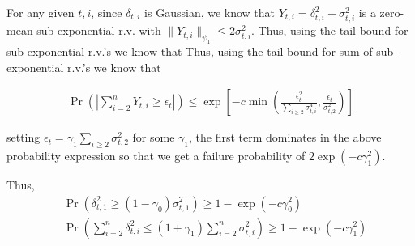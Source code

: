 \documentclass[10pt]{article}
\begin{document}

For any given $t,i$, since $\delta_{t,i}$ is Gaussian, we know that $Y_{t,i} = \delta_{t,i}^2 - \sigma_{t,i}^2$ is a zero-mean sub exponential r.v. with $\|Y_{t,i}\|_{\psi_1} \leq 2 \sigma_{t,i}^2$. Thus, using the tail bound for sub-exponential r.v.'s we know that
Thus, using the tail bound for sum of sub-exponential r.v.'s we know that

\begin{align}\label{eq:del_bnd}
\Pr\left( \left| \sum_{i=2}^n Y_{t,i} \geq \epsilon_{t} \right| \right) \leq \exp\left[-c\min\left(\frac{\epsilon_{t}^2}{\sum_{i \geq 2} \sigma_{t,i}^4}, \frac{\epsilon_{t}}{\sigma_{t,2}^2} \right)\right]
\end{align}

setting $\epsilon_t = \gamma_1 \sum_{i \geq 2} \sigma_{t,2}^2$ for some $\gamma_1$, the first term dominates in the above probability expression so that we get a failure probability of $2 \exp(-c \gamma_1^2)$.


Thus, 
\begin{align*}
&\Pr\left( \delta_{t,1}^2 \geq (1 - \gamma_0) \sigma_{t,1}^2 \right) \geq 1 - \exp(-c \gamma_0^2) \\ 
&\Pr\left( \sum_{i =2}^n \delta_{t,i}^2 \leq (1 + \gamma_1) \sum_{i=2}^n \sigma_{t,i}^2 \right) \geq 1 - \exp(-c \gamma_1^2) \\ 
\end{align*}
\end{document}
